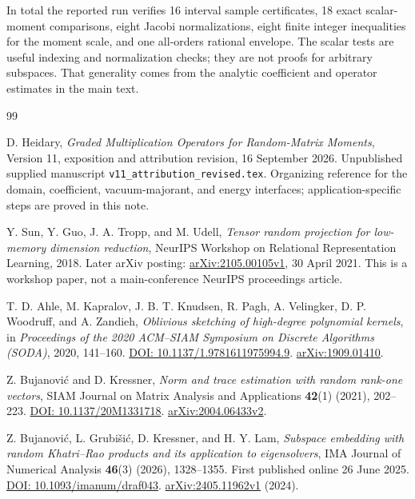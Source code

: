 \documentclass[11pt]{article}
\numberwithin{equation}{section}
\theoremstyle{definition}\newtheorem{definition}[theorem]{Definition}
\theoremstyle{remark}\newtheorem{remark}[theorem]{Remark}
\begin{document}
In total the reported run verifies 16 interval sample certificates, 18 exact
scalar-moment comparisons, eight Jacobi normalizations, eight finite integer
inequalities for the moment scale, and one all-orders rational envelope.
The scalar tests are useful indexing and normalization checks; they are not
proofs for arbitrary subspaces. That generality comes from the analytic
coefficient and operator estimates in the main text.

\clearpage
\begin{thebibliography}{99}
\raggedright
{}
D. Heidary, \emph{Graded Multiplication Operators for Random-Matrix Moments},
Version 11, exposition and attribution revision, 16 September 2026.
Unpublished supplied manuscript \texttt{v11\_attribution\_revised.tex}.
Organizing reference for the domain, coefficient, vacuum-majorant, and energy
interfaces; application-specific steps are proved in this note.

Y. Sun, Y. Guo, J. A. Tropp, and M. Udell,
\emph{Tensor random projection for low-memory dimension reduction},
NeurIPS Workshop on Relational Representation Learning, 2018.
Later arXiv posting: \href{https://arxiv.org/abs/2105.00105v1}{arXiv:2105.00105v1},
30 April 2021. This is a workshop paper, not a main-conference NeurIPS proceedings article.

T. D. Ahle, M. Kapralov, J. B. T. Knudsen, R. Pagh, A. Velingker,
D. P. Woodruff, and A. Zandieh,
\emph{Oblivious sketching of high-degree polynomial kernels},
in \emph{Proceedings of the 2020 ACM--SIAM Symposium on Discrete Algorithms
(SODA)}, 2020, 141--160.
\href{https://doi.org/10.1137/1.9781611975994.9}{DOI: 10.1137/1.9781611975994.9}.
\href{https://arxiv.org/abs/1909.01410}{arXiv:1909.01410}.

Z. Bujanovi\'c and D. Kressner,
\emph{Norm and trace estimation with random rank-one vectors},
SIAM Journal on Matrix Analysis and Applications \textbf{42}(1) (2021), 202--223.
\href{https://doi.org/10.1137/20M1331718}{DOI: 10.1137/20M1331718}.
\href{https://arxiv.org/abs/2004.06433v2}{arXiv:2004.06433v2}.

Z. Bujanovi\'c, L. Grubi\v{s}i\'c, D. Kressner, and H. Y. Lam,
\emph{Subspace embedding with random Khatri--Rao products and its application to
eigensolvers}, IMA Journal of Numerical Analysis \textbf{46}(3) (2026), 1328--1355.
First published online 26 June 2025.
\href{https://doi.org/10.1093/imanum/draf043}{DOI: 10.1093/imanum/draf043}.
\href{https://arxiv.org/abs/2405.11962v1}{arXiv:2405.11962v1} (2024).


\end{thebibliography}
\end{document}
